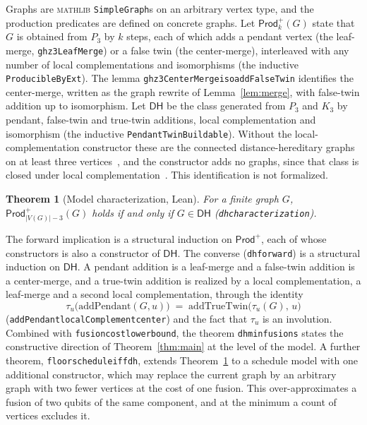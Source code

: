 \documentclass[aps,pra,onecolumn,superscriptaddress,nofootinbib,longbibliography]{revtex4-2}
\theoremstyle{plain}
\newtheorem{theorem}{Theorem}
\theoremstyle{remark}
\newcommand{\DHclass}{\mathsf{DH}}
\newcommand{\Prod}{\mathsf{Prod}}
\newcommand{\codeus}{\textunderscore\allowbreak}
\newcommand{\code}[1]{\texttt{\let\_\codeus #1}}
\begin{document}
Graphs are \textsc{mathlib} \code{SimpleGraph}s on an arbitrary vertex type, and the production predicates
are defined on concrete graphs. Let $\Prod^{+}_k(G)$ state that $G$ is obtained from
$P_3$ by $k$ steps, each of which adds a pendant vertex (the leaf-merge, \code{ghz3LeafMerge}) or a false
twin (the center-merge), interleaved with any number of local complementations and isomorphisms (the
inductive \code{ProducibleByExt}). The lemma \code{ghz3CenterMerge\_iso\_addFalseTwin} identifies the
center-merge, written as the graph rewrite of Lemma~\ref{lem:merge}, with false-twin addition up to
isomorphism. Let $\DHclass$ be the class generated from $P_3$ and $K_3$ by pendant, false-twin and
true-twin additions, local complementation and isomorphism (the inductive \code{PendantTwinBuildable}).
Without the local-complementation constructor these are the connected distance-hereditary graphs on at
least three vertices~\cite{Bandelt1986distance}, and the constructor adds no graphs, since that class is
closed under local complementation~\cite{Oum2005rank}. This identification is not formalized.

\begin{theorem}[Model characterization, Lean]\label{thm:model}
For a finite graph $G$, $\Prod^{+}_{|V(G)|-3}(G)$ holds if and only if $G\in\DHclass$
(\code{dh\_characterization}).
\end{theorem}

The forward implication is a structural induction on $\Prod^{+}$, each of whose constructors is also a
constructor of $\DHclass$. The converse (\code{dh\_forward}) is a structural induction on $\DHclass$. A
pendant addition is a leaf-merge and a false-twin addition is a center-merge, and a true-twin addition is
realized by a local complementation, a leaf-merge and a second local complementation, through the identity
\begin{equation}\label{eq:truetwin}
  \tau_u\big(\mathrm{addPendant}(G,u)\big)\;=\;\mathrm{addTrueTwin}\big(\tau_u(G),\,u\big)
\end{equation}
(\code{addPendant\_localComplement\_center}) and the fact that $\tau_u$ is an involution. Combined with
\code{fusion\_cost\_lower\_bound}, the theorem \code{dh\_min\_fusions} states the constructive direction of
Theorem~\ref{thm:main} at the level of the model. A further theorem, \code{floor\_schedule\_iff\_dh}, extends
Theorem~\ref{thm:model} to a schedule model with one additional constructor, which may replace the current
graph by an arbitrary graph with two fewer vertices at the cost of one fusion. This over-approximates a
fusion of two qubits of the same component, and at the minimum a count of vertices excludes it.
\end{document}
